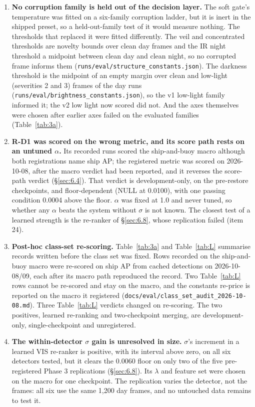 \documentclass[10pt]{article}
\begin{document}
\begin{enumerate}
\item \textbf{No corruption family is held out of the decision layer.} The soft gate's temperature was fitted on a six-family corruption ladder, but it is inert in the shipped preset, so a held-out-family test of it would measure nothing. The thresholds that replaced it were fitted differently. The veil and concentrated thresholds are novelty bounds over clean day frames and the IR night threshold a midpoint between clean day and clean night, so no corrupted frame informs them (\texttt{runs/\allowbreak{}eval/\allowbreak{}structure\_\allowbreak{}constants.json}). The darkness threshold is the midpoint of an empty margin over clean and low-light (severities 2 and 3) frames of the day runs (\texttt{runs/\allowbreak{}eval/\allowbreak{}brightness\_\allowbreak{}constants.json}), so the v1 low-light family informed it; the v2 low light now scored did not. And the axes themselves were chosen after earlier axes failed on the evaluated families (Table~\ref{tab:3a}).
\item \textbf{R-D1 was scored on the wrong metric, and its score path rests on an untuned $\alpha$.} Its recorded runs scored the ship-and-buoy macro although both registrations name ship AP; the registered metric was scored on 2026-10-08, after the macro verdict had been reported, and it reverses the score-path verdict (\S\ref{sec:6.4}). That verdict is development-only, on the pre-restore checkpoints, and floor-dependent (NULL at 0.0100), with one passing condition 0.0004 above the floor. $\alpha$ was fixed at 1.0 and never tuned, so whether any $\alpha$ beats the system without $\sigma$ is not known. The closest test of a learned strength is the re-ranker of \S\ref{sec:6.8}, whose replication failed (item 24).
\item \textbf{Post-hoc class-set re-scoring.} Table~\ref{tab:3a} and Table~\ref{tab:L} summarise records written before the class set was fixed. Rows recorded on the ship-and-buoy macro were re-scored on ship AP from cached detections on 2026-10-08/09, each after its macro path reproduced the record. Two Table~\ref{tab:L} rows cannot be re-scored and stay on the macro, and the constants re-price is reported on the macro it registered (\texttt{docs/\allowbreak{}eval/\allowbreak{}class\_\allowbreak{}set\_\allowbreak{}audit\_\allowbreak{}2026-10-08.md}). Three Table~\ref{tab:L} verdicts changed on re-scoring. The two positives, learned re-ranking and two-checkpoint merging, are development-only, single-checkpoint and unregistered.
\item \textbf{The within-detector $\sigma$ gain is unresolved in size.} $\sigma$'s increment in a learned VIS re-ranker is positive, with its interval above zero, on all six detectors tested, but it clears the 0.0060 floor on only two of the five pre-registered Phase 3 replications (\S\ref{sec:6.8}). Its $\lambda$ and feature set were chosen on the macro for one checkpoint. The replication varies the detector, not the frames: all six use the same 1,200 day frames, and no untouched data remains to test it.
\end{enumerate}
\end{document}
